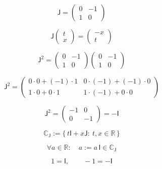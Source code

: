 \documentclass[12pt]{article}
\begin{document}
\begin{equation}
\mathsf{J}=\begin{pmatrix}0&-1\\[2pt]1&0\end{pmatrix}
\end{equation}

\begin{equation}
\mathsf{J}\begin{pmatrix}t\\[2pt]x\end{pmatrix}=\begin{pmatrix}-x\\[2pt]t\end{pmatrix}
\end{equation}

\begin{equation}
\mathsf{J}^2=\begin{pmatrix}0&-1\\[2pt]1&0\end{pmatrix}\begin{pmatrix}0&-1\\[2pt]1&0\end{pmatrix}
\end{equation}

\begin{equation}
\mathsf{J}^2=\begin{pmatrix}0\cdot0+(-1)\cdot1&0\cdot(-1)+(-1)\cdot0\\[2pt]1\cdot0+0\cdot1&1\cdot(-1)+0\cdot0\end{pmatrix}
\end{equation}

\begin{equation}
\mathsf{J}^2=\begin{pmatrix}-1&0\\[2pt]0&-1\end{pmatrix}=-\mathsf{I}
\end{equation}

\begin{equation}
\mathbb{C}_{\mathsf{J}}:=\bigl\{\,t\mathsf{I}+x\mathsf{J}:\ t,x\in\mathbb{R}\,\bigr\}
\end{equation}

\begin{equation}
\forall a\in\mathbb{R}:\quad a:=a\,\mathsf{I}\in\mathbb{C}_{\mathsf{J}}
\end{equation}

\begin{equation}
1=\mathsf{I},\qquad -1=-\mathsf{I}
\end{equation}
\end{document}
